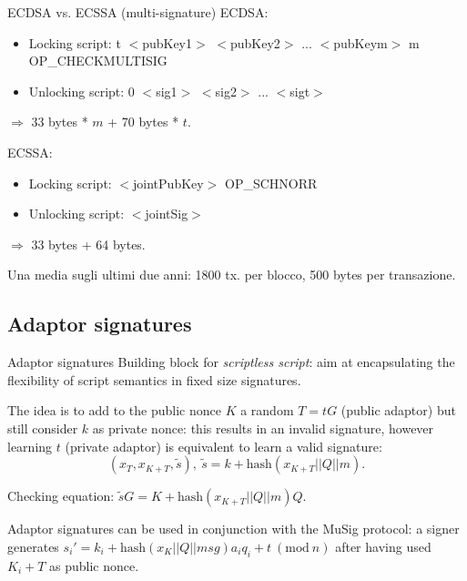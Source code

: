 \documentclass[slidescentered]{beamer}
\begin{document}
	\begin{frame}{ECDSA vs. ECSSA (multi-signature)}
		ECDSA:
		\begin{itemize}
			\item Locking script: t $<$pubKey1$>$ $<$pubKey2$>$ ... $<$pubKeym$>$ \hphantom{em} \hphantom{em} \hphantom{em} \hphantom{ipsem}m
			OP\_CHECKMULTISIG
			\item Unlocking script: 0 $<$sig1$>$ $<$sig2$>$ ... $<$sigt$>$
		\end{itemize}
		
		$\Longrightarrow$ 33 bytes * $m$ + 70 bytes * $t$. 
		
		\bigskip
		\noindent
		ECSSA:
		\begin{itemize}
			\item Locking script: $<$jointPubKey$>$ OP\_SCHNORR
			\item Unlocking script: $<$jointSig$>$
		\end{itemize}
	
	 $\Longrightarrow$ 33 bytes + 64 bytes.
	 
	 Una media sugli ultimi due anni: 1800 tx. per blocco, 500 bytes per transazione.
	\end{frame}

	\subsection{Adaptor signatures}
	\begin{frame}{Adaptor signatures}
		Building block for \textit{scriptless script}: aim at encapsulating the flexibility of script semantics in fixed size signatures.
		
		\bigskip
		\noindent
		The idea is to add to the public nonce $K$ a random $T = tG$ (public adaptor) but still consider $k$ as private nonce: this results in an invalid signature, however learning $t$ (private adaptor) is equivalent to learn a valid signature:
		$$(x_T, x_{K + T}, \tilde{s}), \ \tilde{s} = k + \text{hash}(x_{K + T}||Q||m).$$
		{\centering
		Checking equation: $\tilde{s}G = K + \text{hash}(x_{K + T}||Q||m)Q.$
		\par}
		
		\bigskip
		\noindent
		Adaptor signatures can be used in conjunction with the MuSig protocol:
		a signer generates $s_i' = k_i + \text{hash}(x_K || Q || msg)a_iq_i + t \ (\text{mod} \ n)$ after having used $K_i + T$ as public nonce.
	\end{frame}
\end{document}
